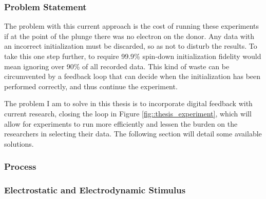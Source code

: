 	\subsubsection{Problem Statement}
	The problem with this current approach is the cost of running these experiments if at the point of the plunge there was no electron on the donor. Any data with an incorrect initialization must be discarded, so as not to disturb the results. To take this one step further, to require 99.9\% spin-down initialization fidelity would mean ignoring over 90\% of all recorded data. This kind of waste can be circumvented by a feedback loop that can decide when the initialization has been performed correctly, and thus continue the experiment.

	The problem I am to solve in this thesis is to incorporate digital feedback with current research, closing the loop in Figure \ref{fig::thesis_experiment}, which will allow for experiments to run more efficiently and lessen the burden on the researchers in selecting their data. The following section will detail some available solutions.

	\subsubsection{Process}

		\subsubsection{Electrostatic and Electrodynamic Stimulus}

%

